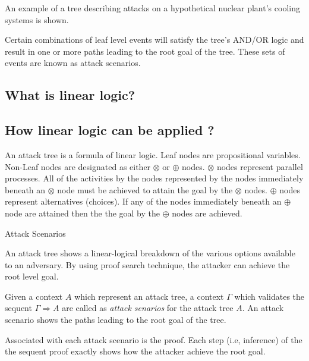 An example of a tree describing attacks on a hypothetical nuclear plant's cooling systems is shown.

Certain combinations of leaf level events will satisfy the tree's AND/OR logic and result in one or more paths leading to the root goal of the tree. These sets of events are known as attack scenarios.

\subsection{What is linear logic?}

\subsection{How linear logic can be applied ?}

An attack tree is a formula of linear logic. 
Leaf nodes are propositional  variables. 
Non-Leaf nodes are designated as either $\otimes$ or $\oplus$ nodes. 
$\otimes$ nodes represent parallel processes.
All of the activities by the nodes represented by the nodes immediately beneath an $\otimes$ node must be achieved to attain the goal by the $\otimes$ nodes. 
$\oplus$ nodes represent alternatives (choices). If any of the nodes immediately beneath an $\oplus$ node are attained then the the goal by the $\oplus$ nodes are achieved. 

Attack Scenarios

An attack tree shows a linear-logical breakdown of the various options available to an adversary.
By using proof search technique, the attacker can achieve the root level goal. 

Given a context $A$ which represent an attack tree, a context $\Gamma$ which validates the sequent  $\Gamma \Rightarrow A$ are called as {\it attack senarios} for the attack tree $A$. 
An attack scenario shows the paths leading to the root goal of the tree. 

Associated with each attack scenario is the proof. Each step (i.e, inference)  of the the sequent proof exactly shows  how the attacker achieve the root goal. 

